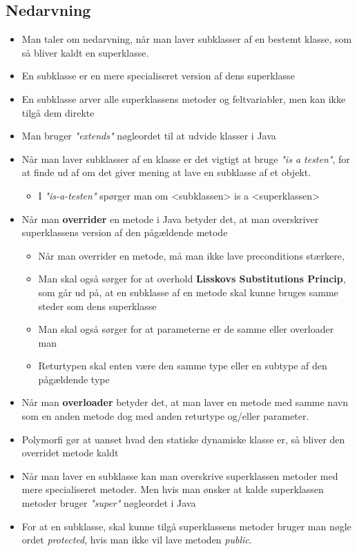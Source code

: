 \documentclass{article}
\begin{document}
\subsection{Nedarvning}
\begin{itemize}
	\item Man taler om nedarvning, når man laver subklasser af en bestemt klasse, som så bliver kaldt en superklasse.
	\item En subklasse er en mere specialiseret version af dens superklasse
	\item En subklasse arver alle superklassens metoder og feltvariabler, men kan ikke tilgå dem direkte
		\item Man bruger \textit{"extends"} nøgleordet til at udvide klasser i Java
	\item Når man laver subklasser af en klasse er det vigtigt at bruge \textit{"is a testen"}, for at finde ud af om det giver mening at lave en subklasse af et objekt.
	\begin{itemize}
		\item I \textit{"is-a-testen"} spørger man om <subklassen> is a <superklassen>
	\end{itemize}
	\item Når man \textbf{overrider} en metode i Java betyder det, at man overskriver superklassens version af den pågældende metode
	\begin{itemize}
		\item Når man overrider en metode, må man ikke lave preconditions stærkere,
		\item Man skal også sørger for at overhold \textbf{Lisskovs Substitutions Princip}, som går ud på, at en subklasse af en metode skal kunne bruges samme steder som dens superklasse 
		\item Man skal også sørger for at parameterne er de samme eller overloader man
		\item Returtypen skal enten være den samme type eller en subtype af den pågældende type 
	\end{itemize}
	\item Når man \textbf{overloader} betyder det, at man laver en metode med samme navn som en anden metode dog med anden returtype og/eller parameter.
	\item Polymorfi gør at uanset hvad den statiske dynamiske klasse er, så bliver den overridet metode kaldt
	\item Når man laver en subklasse kan man overskrive superklassen metoder med mere specialiseret metoder. Men hvis man ønsker at kalde superklassen metoder bruger \textit{"super"} nøgleordet i Java
	\item For at en subklasse, skal kunne tilgå superklassens metoder bruger man nøgle ordet \textit{protected}, hvis man ikke vil lave metoden \textit{public}.
\end{itemize}
\end{document}
